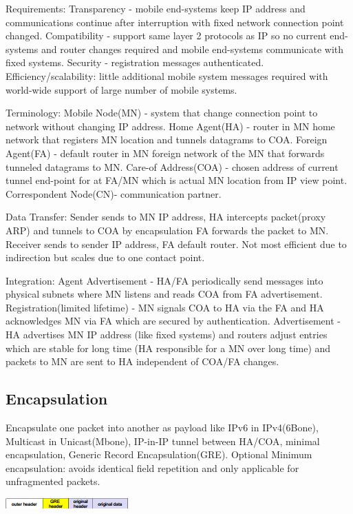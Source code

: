 \documentclass[9pt]{extarticle}
\begin{document}
\begin{multicols}{2}
Requirements: Transparency - mobile end-systems keep IP address and communications continue after interruption with fixed network connection point changed. Compatibility - support same layer 2 protocols as IP so no current end-systems and router changes required and mobile end-systems communicate with fixed systems. Security - registration messages authenticated. Efficiency/scalability: little additional mobile system messages required with world-wide support of large number of mobile systems.

Terminology: Mobile Node(MN) - system that change connection point to network without changing IP address. Home Agent(HA) - router in MN home network that registers MN location and tunnels datagrams to COA. Foreign Agent(FA) - default router in MN foreign network of the MN that forwards tunneled datagrams to MN. Care-of Address(COA) - chosen address of current tunnel end-point for at FA/MN which is actual MN location from IP view point. Correspondent Node(CN)- communication partner.

Data Transfer: Sender sends to MN IP address, HA intercepts packet(proxy ARP) and tunnels to COA by encapsulation FA forwards the packet to MN. Receiver sends to sender IP address, FA default router. Not most efficient due to indirection but scales due to one contact point.

Integration: Agent Advertisement - HA/FA periodically send messages into physical subnets where MN listens and reads COA from FA advertisement. Registration(limited lifetime) - MN signals COA to HA via the FA and HA acknowledges MN via FA which are secured by authentication. Advertisement - HA advertises MN IP address (like fixed systems) and routers adjust entries which are stable for long time (HA responsible for a MN over long time) and packets to MN are sent to HA independent of COA/FA changes.

\subsection{Encapsulation}

Encapsulate one packet into another as payload like IPv6 in IPv4(6Bone), Multicast in Unicast(Mbone), IP-in-IP tunnel between HA/COA, minimal encapsulation, Generic Record Encapsulation(GRE). Optional Minimum encapsulation: avoids identical field repetition and only applicable for unfragmented packets.

\includegraphics{gre.png}


\end{multicols}
\end{document}
